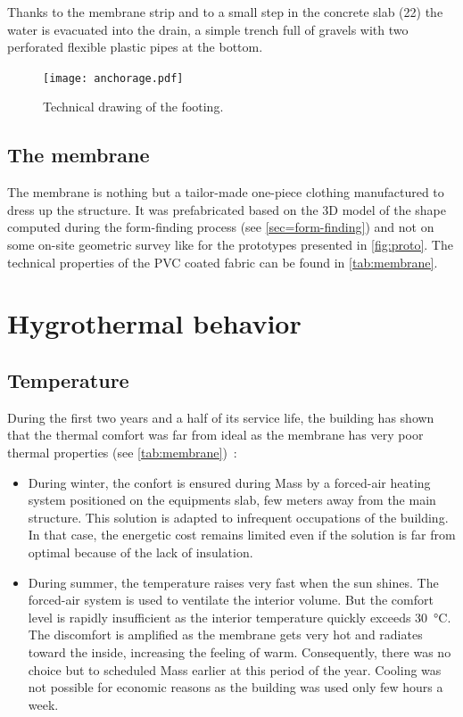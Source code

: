 Thanks to the membrane strip and to a small step in the concrete slab (22) the water is evacuated into the drain, a simple trench full of gravels with two perforated flexible plastic pipes at the bottom.

\begin{figure}[!b]
	\centering
	\begin{fullpage}
	\texttt{[image: anchorage.pdf]}
	\caption{Technical drawing of the footing.}
	\label{fig:anchorage_dwg}
	\end{fullpage}
\end{figure}

\subsection{The membrane}
The membrane is nothing but a tailor-made one-piece clothing manufactured to dress up the structure. It was prefabricated based on the 3D model of the shape computed during the form-finding process (see \cref{sec=form-finding}) and not on some on-site geometric survey like for the prototypes presented in \cref{fig:proto}. The technical properties of the PVC coated fabric can be found in \cref{tab:membrane}.

\clearpage
\section{Hygrothermal behavior}\label{sec=hygro}
\subsection{Temperature}\label{sec=temperature}
During the first two years and a half of its service life, the building has shown that the thermal comfort was far from ideal as the membrane has very poor thermal properties (see \cref{tab:membrane})~:
\begin{itemize}
\item During winter, the confort is ensured during Mass by a forced-air heating system positioned on the equipments slab, few meters away from the main structure. This solution is adapted to infrequent occupations of the building. In that case, the energetic cost remains limited even if the solution is far from optimal because of the lack of insulation.
\item During summer, the temperature raises very fast when the sun shines. The forced-air system is used to ventilate the interior volume. But the comfort level is rapidly insufficient as the interior temperature quickly exceeds \SI{30}{\celsius}. The discomfort is amplified as the membrane gets very hot and radiates toward the inside, increasing the feeling of warm. Consequently, there was no choice but to scheduled Mass earlier at this period of the year. Cooling was not possible for economic reasons as the building was used only few hours a week.
\end{itemize}

